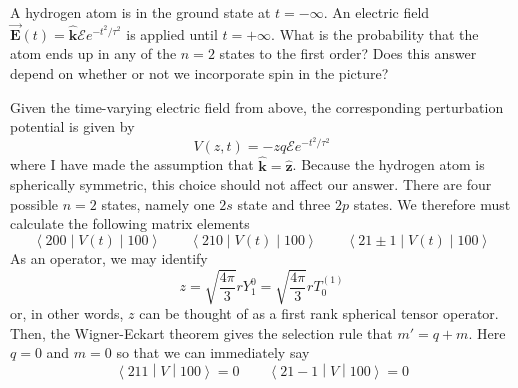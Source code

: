 \documentclass[a4paper, 11pt]{article}
\newcommand{\E}{\mathcal{E}}
\newcommand{\matrixel}[3]{\ensuremath{\left\langle #1 \middle| #2 \middle| #3 \right\rangle}}
\newcommand{\unit}[1]{\hat{\boldsymbol{#1}}}
\newcommand{\bvec}[1]{\vec{\boldsymbol{#1}}}
\newenvironment{solution}{%
	\begin{list}{}{%
			\setlength{\topsep}{0pt}%
			\setlength{\leftmargin}{0.5cm}%
			\setlength{\rightmargin}{0.5cm}%
			\setlength{\listparindent}{\parindent}%
			\setlength{\itemindent}{\parindent}%
			\setlength{\parsep}{\parskip}%
		}%
		\item[]}{\end{list}}
\begin{document}
\begin{enumerate}[leftmargin=0em, label=\textbf{\arabic*}]
  \item A hydrogen atom is in the ground state at $t=-\infty$. An electric field
    $\bvec{E}(t)=\unit{k}\E e^{-t^2/\tau^2}$ is applied until $t=+\infty$. What
    is the probability that the atom ends up in any of the $n=2$ states to the
    first order? Does this answer depend on whether or not we incorporate spin
    in the picture? \\
    \begin{solution}
      Given the time-varying electric field from above, the corresponding
      perturbation potential is given by
      \begin{equation}
        V(z,t)= -zq\E e^{-t^2/\tau^2}
      \end{equation}
      where I have made the assumption that $\unit{k}=\unit{z}$. Because the
      hydrogen atom is spherically symmetric, this choice should not affect our
      answer. There are four possible $n=2$ states, namely one $2s$ state and
      three $2p$ states. We therefore must calculate the following matrix
      elements
      \begin{equation}
        \matrixel{200}{V(t)}{100}\qquad\matrixel{210}{V(t)}{100}\qquad\matrixel{21\pm 1}{V(t)}{100}
      \end{equation}
      As an operator, we may identify
      \begin{equation}
        z = \sqrt{\frac{4\pi}{3}}rY_1^0 = \sqrt{\frac{4\pi}{3}}rT_0^{(1)}
      \end{equation}
      or, in other words, $z$ can be thought of as a first rank spherical tensor
      operator. Then, the Wigner-Eckart theorem gives the selection rule that
      $m'=q+m$. Here $q=0$ and $m=0$ so that we can immediately say
      \begin{equation}
        \matrixel{211}{V}{100}=0 \qquad \matrixel{21-1}{V}{100}=0
      \end{equation}


\end{solution}
\end{enumerate}
\end{document}
